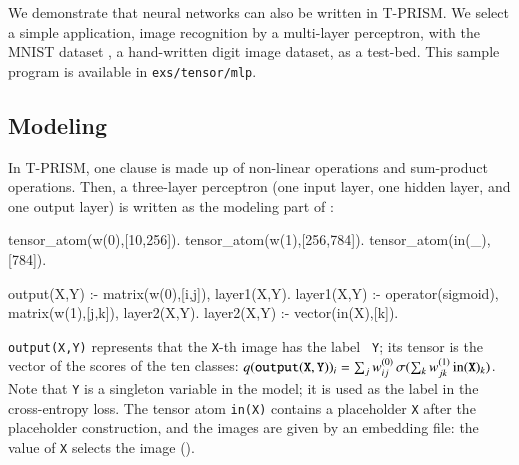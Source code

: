 \documentclass[a4paper]{report}
\begin{document}
We demonstrate that neural networks can also be written in T-PRISM.  We
select a simple application, image recognition by a multi-layer
perceptron, with the MNIST dataset \cite{lecun1998mnist}, a hand-written
digit image dataset, as a test-bed.  This sample program is available in {\tt exs/tensor/mlp}.

\subsection*{Modeling}
In  T-PRISM,  one  clause  is  made  up  of  non-linear  operations  and
sum-product  operations.   Then,  a three-layer  perceptron (one  input
layer, one hidden layer, and  one output layer) is written as the
modeling part of :
\begin{prologcode}
tensor_atom(w(0),[10,256]).   %
tensor_atom(w(1),[256,784]).  %
tensor_atom(in(_),[784]).     %

output(X,Y) :- matrix(w(0),[i,j]), layer1(X,Y).
layer1(X,Y) :- operator(sigmoid), matrix(w(1),[j,k]), layer2(X,Y).
layer2(X,Y) :- vector(in(X),[k]).
\end{prologcode}
{\tt output(X,Y)} represents that the {\tt X}-th image has the label {\tt
	Y}; its tensor is the vector of the scores of the ten classes:
$q({\tt output(X,Y)})_i=\sum_j w^{(0)}_{ij}\,\sigma(\sum_k w^{(1)}_{jk}\,{\rm in}({\tt X})_k)$.
Note that {\tt Y} is a singleton variable in the model; it is used as
the label in the cross-entropy loss.  The tensor atom {\tt in(X)} contains a
placeholder {\tt X} after the placeholder construction, and the images
are given by an embedding file: the value of {\tt X} selects the image
().
\end{document}
